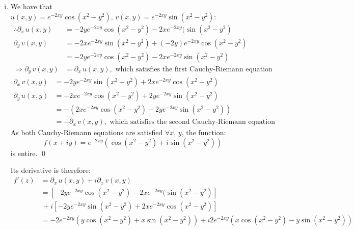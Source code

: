\documentclass[a4paper, titlepage, DIV=14]{scrartcl}
\begin{document}
\begin{enumerate}
        \begin{enumerate}[i)]
            \item We have that $u(x,y) = e^{-2xy}\cos(x^{2}-y^{2}), \, v(x,y) = e^{-2xy}\sin(x^{2}-y^{2})$:
            \begin{align*}
                \therefore \partial_{x} \, u(x,y) &= -2ye^{-2xy}\cos(x^{2}-y^{2})
                                                - 2xe^{-2xy}(\sin(x^{2}-y^{2}) \\
                \partial_{y} \, v(x,y) &= -2xe^{-2xy}\sin(x^{2}-y^{2}) + (-2y)e^{-2xy}\cos(x^{2}-y^{2}) \\
                                    &= -2ye^{-2xy}\cos(x^{2}-y^{2}) - 2xe^{-2xy}\sin(x^{2}-y^{2}) \\
                \Rightarrow \partial_{y} \, v(x,y) &= \partial_{x} \, u(x,y), \text{ which satisfies the first Cauchy-Riemann equation}
            \end{align*}
            \begin{align*}
                \partial_{x} \, v(x,y) &= -2ye^{-2xy}\sin(x^{2}-y^{2}) + 2xe^{-2xy}\cos(x^{2}-y^{2}) \\
                \partial_{y} \, u(x,y) &= -2xe^{-2xy}\cos(x^{2}-y^{2}) + 2ye^{-2xy}\sin(x^{2}-y^{2}) \\
                                    &= -(2xe^{-2xy}\cos(x^{2}-y^{2}) - 2ye^{-2xy}\sin(x^{2}-y^{2})) \\
                                    &= -\partial_{x} \, v(x,y), \text{ which satisfies the second Cauchy-Riemann equation}
            \end{align*}
            As both Cauchy-Riemann equations are satisfied $\forall x, \, y$, the function: 
            \begin{equation*}
                f(x+iy)=e^{-2xy}(\cos(x^{2}-y^{2})+i\sin(x^{2}-y^{2}))
            \end{equation*}
            is entire. \qed

            Its derivative is therefore:
            \begin{align*}
                f'(z) &= \partial_{x} \, u(x,y) +i\partial_{x} \, v(x,y) \\
                    &= [-2ye^{-2xy}\cos(x^{2}-y^{2})
                        - 2xe^{-2xy}(\sin(x^{2}-y^{2})] \\
                        &\, + i[-2ye^{-2xy}\sin(x^{2}-y^{2}) 
                        + 2xe^{-2xy}\cos(x^{2}-y^{2})] \\
                    &= -2e^{-2xy}(y\cos(x^{2}-y^{2})+x\sin(x^{2}-y^{2})) + i2e^{-2xy}(x\cos(x^{2}-y^{2})-y\sin(x^{2}-y^{2})) \\
            \end{align*}


\end{enumerate}
\end{enumerate}
\end{document}
